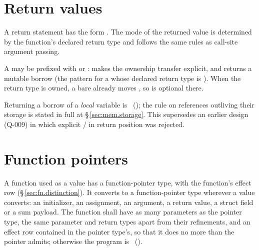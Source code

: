 \section{Return values}
\label{sec:fn.return}

\pnum
A return statement has the form .  The mode of the
returned value is determined by the function's declared return type and
follows the same rules as call-site argument passing.

\pnum
A  may be prefixed with  or :
 makes the ownership transfer explicit, and
 returns a mutable borrow (the pattern for a 
whose declared return type is ).  When the return type is owned,
a bare  already moves , so  is optional
there.

\begin{note}
  Returning a borrow of a \emph{local} variable is \illformed{}~(); the rule on
  references outliving their storage is stated in full at \S\,\ref{sec:mem.storage}.  This
  supersedes an earlier design (Q-009) in which explicit / in return
  position was rejected.
\end{note}


\section{Function pointers}
\label{sec:fn.pointer}

\pnum
A function used as a value has a function-pointer type,  with the function's
effect row (\S\,\ref{sec:fn.distinction}).  It converts to a function-pointer type wherever a
value converts: an initializer, an assignment, an argument, a return value, a struct field or a
sum payload.  The function shall have as many parameters as the pointer type, the same parameter
and return types apart from their refinements, and an effect row contained in the pointer type's,
so that it does no more than the pointer admits; otherwise the program is
\illformed{}~().

